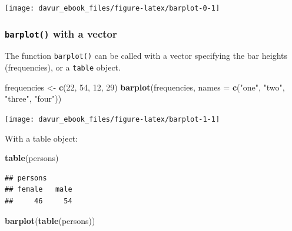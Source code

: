 \documentclass[]{book}
\newenvironment{Shaded}{\begin{snugshade}}{\end{snugshade}}
\newcommand{\DataTypeTok}[1]{\textcolor[rgb]{0.13,0.29,0.53}{#1}}
\newcommand{\DecValTok}[1]{\textcolor[rgb]{0.00,0.00,0.81}{#1}}
\newcommand{\KeywordTok}[1]{\textcolor[rgb]{0.13,0.29,0.53}{\textbf{#1}}}
\newcommand{\NormalTok}[1]{#1}
\newcommand{\StringTok}[1]{\textcolor[rgb]{0.31,0.60,0.02}{#1}}
\begin{document}
\begin{center}\texttt{[image: davur\_ebook\_files/figure-latex/barplot-0-1]} \end{center}

\hypertarget{barplot-with-a-vector}{%
\subsubsection*{\texorpdfstring{\texttt{barplot()} with a vector}{barplot() with a vector}}\label{barplot-with-a-vector}}

The function \texttt{barplot()} can be called with a vector specifying the bar heights (frequencies), or a \texttt{table} object.

\begin{Shaded}
\begin{Highlighting}[]
\NormalTok{frequencies <-}\StringTok{ }\KeywordTok{c}\NormalTok{(}\DecValTok{22}\NormalTok{, }\DecValTok{54}\NormalTok{, }\DecValTok{12}\NormalTok{, }\DecValTok{29}\NormalTok{)}
\KeywordTok{barplot}\NormalTok{(frequencies, }\DataTypeTok{names =} \KeywordTok{c}\NormalTok{(}\StringTok{"one"}\NormalTok{, }\StringTok{"two"}\NormalTok{, }\StringTok{"three"}\NormalTok{, }\StringTok{"four"}\NormalTok{))}
\end{Highlighting}
\end{Shaded}

\begin{center}\texttt{[image: davur\_ebook\_files/figure-latex/barplot-1-1]} \end{center}

With a table object:

\begin{Shaded}
\begin{Highlighting}[]
\KeywordTok{table}\NormalTok{(persons)}
\end{Highlighting}
\end{Shaded}

\begin{verbatim}
## persons
## female   male 
##     46     54
\end{verbatim}

\begin{Shaded}
\begin{Highlighting}[]
\KeywordTok{barplot}\NormalTok{(}\KeywordTok{table}\NormalTok{(persons))}
\end{Highlighting}
\end{Shaded}
\end{document}
